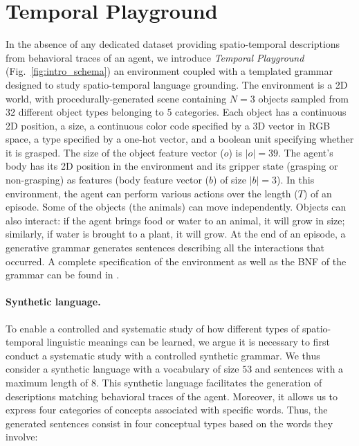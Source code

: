 \section{Temporal Playground}\label{temp-plg}

In the absence of any dedicated dataset providing spatio-temporal descriptions from behavioral traces of an agent, we introduce \textit{Temporal Playground} (Fig.~\ref{fig:intro_schema}) an environment coupled with a templated grammar designed to study spatio-temporal language grounding. The environment is a 2D world, with procedurally-generated scene containing $N=3$ objects sampled from 32 different object types belonging to 5 categories. Each object has a continuous 2D position, a size, a continuous color code specified by a 3D vector in RGB space, a type specified by a one-hot vector, and a boolean unit specifying whether it is grasped. The size of the object feature vector ($o$) is $|o|=39$. The agent's body has its 2D position in the environment and its gripper state (grasping or non-grasping) as features (body feature vector ($b$) of size $|b|=3$). In this environment, the agent can perform various actions over the length ($T$) of an episode. Some of the objects (the animals) can move independently. Objects can also interact: if the agent brings food or water to an animal, it will grow in size; similarly, if water is brought to a plant, it will grow. At the end of an episode, a generative grammar generates sentences describing all the interactions that occurred. A complete specification of the environment as well as the BNF of the grammar can be found in .

\paragraph{Synthetic language.} To enable a controlled and systematic study of how different types of spatio-temporal linguistic meanings can be learned, we argue it is necessary to first conduct a systematic study with a controlled synthetic grammar. We thus consider a synthetic language with a vocabulary of size $53$ and sentences with a maximum length of $8$. This synthetic language facilitates the generation of descriptions matching behavioral traces of the agent. Moreover, it allows us to express four categories of concepts associated with specific words. Thus, the generated sentences consist in four conceptual types based on the words they involve: 

